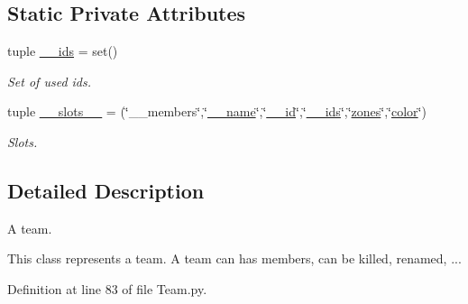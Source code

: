 \subsection*{\-Static \-Private \-Attributes}
\begin{DoxyCompactItemize}
\item 
tuple \hyperlink{class_team_1_1_team_a6ad398e49c618e8fbcbc198c02d467dc}{\-\_\-\-\_\-ids} = set()
\begin{DoxyCompactList}\small\item\em \-Set of used ids. \end{DoxyCompactList}\item 
\hypertarget{class_team_1_1_team_a837f68dbf7506cdd33ce3eec46ada8b4}{
tuple \hyperlink{class_team_1_1_team_a837f68dbf7506cdd33ce3eec46ada8b4}{\-\_\-\-\_\-slots\-\_\-\-\_\-} = (\char`\"{}\-\_\-\-\_\-members\char`\"{},\char`\"{}\hyperlink{class_team_1_1_team_a371424025affb2cf973b2a81eb4bc6d9}{\-\_\-\-\_\-name}\char`\"{},\char`\"{}\hyperlink{class_team_1_1_team_a2a1c34bafb6d74b8e064c33cfbe4397b}{\-\_\-\-\_\-id}\char`\"{},\char`\"{}\hyperlink{class_team_1_1_team_a6ad398e49c618e8fbcbc198c02d467dc}{\-\_\-\-\_\-ids}\char`\"{},\char`\"{}\hyperlink{class_team_1_1_team_afbbfa95c8949d0da4ab274c8a4d88753}{zones}\char`\"{},\char`\"{}\hyperlink{class_team_1_1_team_a15e6e8ac7bbd66106dc357906ee6fcb7}{color}\char`\"{})}
\label{class_team_1_1_team_a837f68dbf7506cdd33ce3eec46ada8b4}

\begin{DoxyCompactList}\small\item\em \-Slots. \end{DoxyCompactList}\end{DoxyCompactItemize}


\subsection{\-Detailed \-Description}
\-A team. 

\-This class represents a team. \-A team can has members, can be killed, renamed, ... 

\-Definition at line 83 of file \-Team.\-py.



